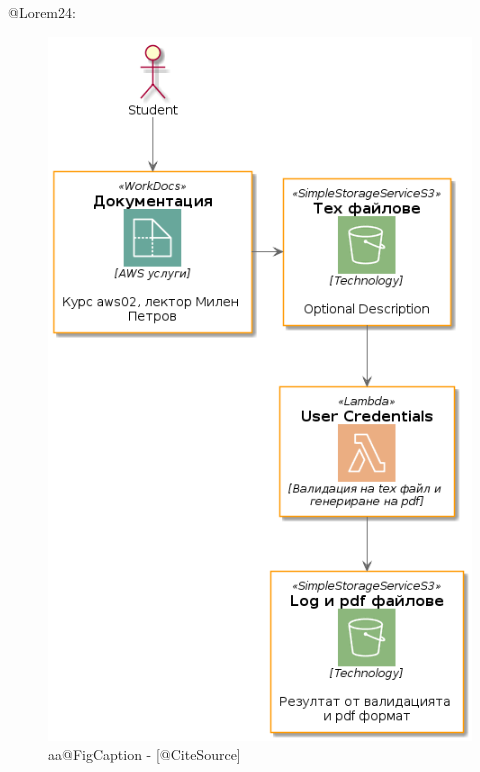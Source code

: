 \documentclass[12pt]{article}
\begin{document}
\noindent   @Lorem24:

\begin{figure}
\centering
   \caption{aa@FigCaption - [@CiteSource]}
   \includegraphics[scale=0.5\textwidth]{9999_fig1.png}
\end{figure}
\end{document}
